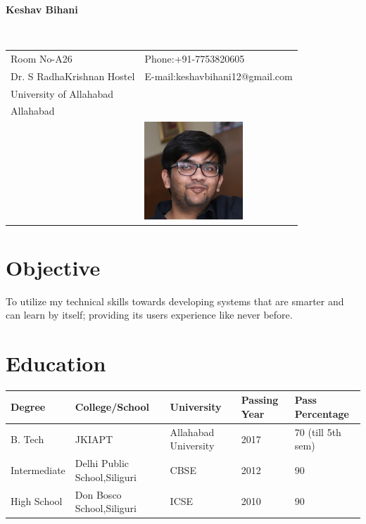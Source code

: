 \documentclass[12pt]{article}
\begin{document}
\vspace{0.5in}
\begin{center}\begin{large}\textbf{Keshav Bihani}\end{large}\end{center}\textbf{\hrulefill}\\

\begin{tabular}{@{}p{4in}p{3in}}
Room No-A26 & {Phone:}+91-7753820605 \\
Dr. S RadhaKrishnan Hostel & {E-mail:}keshavbihani12@gmail.com\\
University of Allahabad \\
Allahabad\\
& \includegraphics[scale=0.8]{keshav1.jpg}\\
\end{tabular}

\section*{Objective}
To utilize my technical skills towards developing systems that are smarter and can learn by itself; providing its users experience like never before.   
\section*{Education}
\begin{tabular}{|l|l|l|l|l|}
\hline
Degree & College/School & University & Passing Year & Pass Percentage\\
\hline
B. Tech & JKIAPT & Allahabad University & 2017 & 70 (till 5th sem)\\
\hline
Intermediate & Delhi Public School,Siliguri & CBSE & 2012 & 90\\
\hline
High School & Don Bosco School,Siliguri & ICSE & 2010 & 90\\
\hline
\end{tabular}
\end{document}
